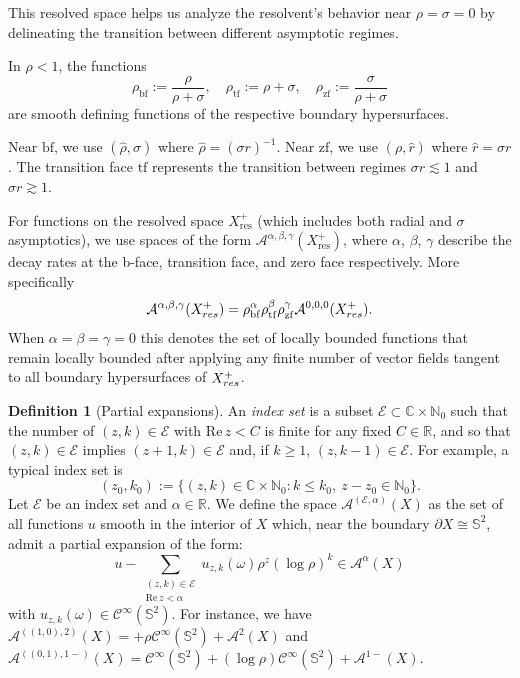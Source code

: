 \documentclass[10pt,a4paper,reqno]{amsart}
\renewcommand{\Re}{\operatorname{Re}}
\newcommand{\CI}{\mathcal{C}^\infty}
\newcommand{\RR}{\mathbb{R}}
\renewcommand\Re{\operatorname{Re}}
\newcommand{\A}{\mathcal{A}}
\newcommand{\tface}{{\mathrm{tf}}}
\newcommand{\zface}{{\mathrm{zf}}}
\newcommand{\bface}{{\mathrm{bf}}}
\renewcommand{\S}{{\mathbb S}}
\let\hat\widehat
\theoremstyle{definition}
\newtheorem{definition}[theorem]{Definition}
\theoremstyle{remark}
\numberwithin{equation}{section}
\renewcommand{\Re}{\mathrm{Re}\,}
\newcommand{\C}{\mathbb C}
\newcommand{\N}{{\mathbb N}}
\newcommand{\R}{\mathbb R}
\newcommand{\calA}{\mathcal A}
\newcommand{\cA}{\mathcal A}
\newcommand{\cE}{\mathcal E}
\begin{document}
This resolved space helps us analyze the resolvent's behavior near $\rho = \sigma = 0$ by delineating the transition between different asymptotic regimes.

In $\rho<1$, the functions
\[
  \rho_\bface := \frac{\rho}{\rho+\sigma},\quad
  \rho_\tface := \rho+\sigma,\quad
  \rho_\zface := \frac{\sigma}{\rho+\sigma}
\]
are smooth defining functions of the respective boundary hypersurfaces. 

Near $\bface$, we use $(\hat\rho, \sigma)$ where $\hat\rho = (\sigma r)^{-1}$. Near $\zface$, we use $(\rho, \hat r)$ where $\hat r = \sigma r$. The transition face $\tface$ represents the transition between regimes $\sigma r \lesssim 1$ and $\sigma r \gtrsim 1$.

For functions on the resolved space $X^+_\text{res}$ (which includes both radial and $\sigma$ asymptotics), we use spaces of the form $\calA^{\alpha,\beta,\gamma}(X^+_\text{res})$, where $\alpha$, $\beta$, $\gamma$ describe the decay rates at the b-face, transition face, and zero face respectively. More specifically
\[
  \cA^{\alpha,\beta,\gamma}(X^+_{\rm res})=\rho_\bface^\alpha\rho_\tface^\beta\rho_\zface^\gamma\cA^{0,0,0}(X^+_{\rm res}).
\]
When $\alpha=\beta=\gamma=0$ this denotes the set of locally bounded functions that remain locally bounded after applying any finite number of vector fields tangent to all boundary hypersurfaces of $X^+_{\rm res}$. 


\begin{definition}[Partial expansions]
\label{defn:partial expansion}
An \textit{index set} is a subset $\cE\subset\C\times\N_0$ such that the number of $(z,k)\in\cE$ with $\Re z<C$ is finite for any fixed $C\in\R$, and so that $(z,k)\in\cE$ implies $(z+1,k)\in\cE$ and, if $k\geq 1$, $(z,k-1)\in\cE$. For example, a typical index set is
\[
  (z_0,k_0) := \{ (z,k)\in\C\times\N_0 \colon k\leq k_0,\ z-z_0\in\N_0 \}.
\]
Let $\cE$ be an index set and $\alpha\in\RR$. We define the space $\calA^{(\cE,\alpha)}(X)$ as the set of all functions $u$ smooth in the interior of $X$ which, near the boundary $\partial X \cong \S^2$, admit a partial expansion of the form:
\[
u -\sum_{\substack{(z,k)\in\cE\\\mathrm{Re}\,z < \alpha}} u_{z,k}(\omega) \rho^z (\log\rho)^k \in \A^\alpha (X)
\]
with $u_{z,k}(\omega)\in \CI(\S^2)$. For instance, we have
$\A^{((1,0),2)}(X) = + \rho\CI(\S^2) + \A^{2}(X)$ and $\A^{((0,1),1-)}(X) = \CI(\S^2) + (\log\rho)\CI(\S^2) + \A^{1-}(X)$. 
\end{definition}
\end{document}
